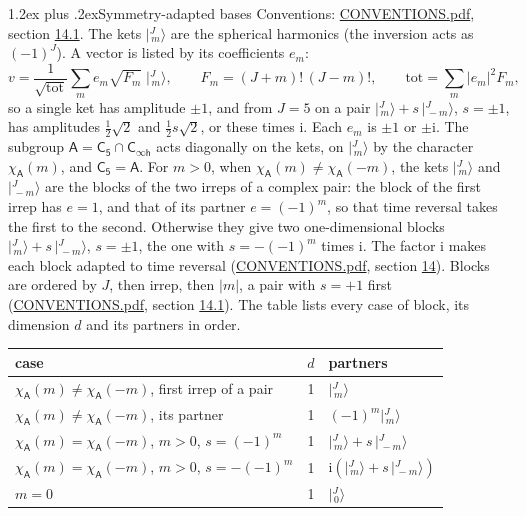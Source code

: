 \documentclass[10pt,a4paper]{article}
\makeatletter
\renewcommand\section{\@startsection{section}{1}{\z@}{-3ex plus -1ex minus -.2ex}%
  {1.2ex plus .2ex}{\normalfont\large\sffamily\bfseries\color{parttitle}}}
\numberwithin{equation}{section}
\newcommand{\grp}[1]{\mathsf{#1}}
\newcommand{\iunit}{\mathrm{i}}
\newcommand{\chiA}{\chi_{\grp{A}}}
\newcommand{\jm}[2]{\bigl\lvert{}^{#1}_{\,#2}\bigr\rangle}
\makeatother
\begin{document}
\section{Symmetry-adapted bases}\label{s:bases}
Conventions: \href{../../CONVENTIONS.pdf}{CONVENTIONS.pdf}, section \href{../../CONVENTIONS.pdf\#conv.14.1}{14.1}.
\leavevmode\label{n:index.m}\label{n:vector.ket}The kets $\jm{J}{m}$ are the spherical harmonics (the inversion acts as $(-1)^J$). \label{n:index.ketcoefficient}\label{n:vector.basis.symmetry}\label{n:index.ketweight}\label{n:index.total}A vector is listed by its coefficients $e_m$:
\begin{equation}\label{e:ket}v = \frac{1}{\sqrt{\mathrm{tot}}}\sum_m e_m\sqrt{F_m}\;\jm{J}{m},\qquad F_m = (J+m)!\,(J-m)!,\qquad \mathrm{tot} = \sum_m |e_m|^2F_m,\end{equation}
\leavevmode\label{n:index.pair.sign}so a single ket has amplitude $\pm1$, and from $J = 5$ on a pair $\jm{J}{m} + s\,\jm{J}{-m}$, $s = \pm1$, has amplitudes $\tfrac{1}{2}\sqrt{2}$ and $\tfrac{1}{2}s\sqrt{2}$, or these times $\iunit$. Each $e_m$ is $\pm1$ or $\pm\iunit$.
\leavevmode\label{n:group.A}\label{n:function.character.abelian}The subgroup $\grp{A} = \grp{C_{5}}\cap\grp{C_{\infty h}}$ acts diagonally on the kets, on $\jm{J}{m}$ by the character $\chiA(m)$, and $\grp{C_{5}} = \grp{A}$. For $m > 0$, when $\chiA(m) \ne \chiA(-m)$, the kets $\jm{J}{m}$ and $\jm{J}{-m}$ are the blocks of the two irreps of a complex pair: the block of the first irrep has $e = 1$, and that of its partner $e = (-1)^m$, so that time reversal takes the first to the second. Otherwise they give two one-dimensional blocks $\jm{J}{m} + s\,\jm{J}{-m}$, $s = \pm1$, the one with $s = -(-1)^m$ times $\iunit$. The factor $\iunit$ makes each block adapted to time reversal (\href{../../CONVENTIONS.pdf}{CONVENTIONS.pdf}, section \href{../../CONVENTIONS.pdf\#conv.14}{14}). Blocks are ordered by $J$, then irrep, then $|m|$, a pair with $s = +1$ first (\href{../../CONVENTIONS.pdf}{CONVENTIONS.pdf}, section \href{../../CONVENTIONS.pdf\#conv.14.1}{14.1}).
\leavevmode\label{n:head.case}\label{n:head.partners}The table lists every case of block, its dimension $d$ and its partners in order.
\begin{center}\begin{tabular}{@{}lrl@{}}\toprule
case & $d$ & partners\\\midrule
$\chiA(m) \ne \chiA(-m)$, first irrep of a pair & 1 & $\jm{J}{m}$\\
$\chiA(m) \ne \chiA(-m)$, its partner & 1 & $(-1)^m\jm{J}{m}$\\
$\chiA(m) = \chiA(-m)$, $m > 0$, $s = (-1)^m$ & 1 & $\jm{J}{m} + s\,\jm{J}{-m}$\\
$\chiA(m) = \chiA(-m)$, $m > 0$, $s = -(-1)^m$ & 1 & $\iunit(\jm{J}{m} + s\,\jm{J}{-m})$\\
$m = 0$ & 1 & $\jm{J}{0}$\\
\bottomrule\end{tabular}\end{center}
\end{document}
